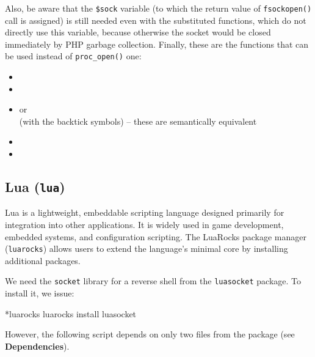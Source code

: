 Also, be aware that the \texttt{\$sock} variable (to which the return value of \texttt{fsockopen()} call is assigned) is still needed even with the substituted functions, which do not directly use this variable, because otherwise the socket would be closed immediately by PHP garbage collection. Finally, these are the functions that can be used instead of \texttt{proc\_open()} one:

\begin{itemize}

\item {}
\item {}
\item {} or \\  (with the backtick symbols) -- these are semantically equivalent
\item {}
\item {}

\end{itemize}


\subsection{Lua (\texttt{lua})}


Lua is a lightweight, embeddable scripting language designed primarily for integration into other applications. It is widely used in game development, embedded systems, and configuration scripting. The LuaRocks package manager (\texttt{luarocks}) allows users to extend the language's minimal core by installing additional packages.

We need the \texttt{socket} library for a reverse shell from the \texttt{luasocket} package. To install it, we issue:

\begin{cmdline}{*}{luarocks}{}
luarocks install luasocket
\end{cmdline}

However, the following script depends on only two files from the package (see \textbf{Dependencies}).


